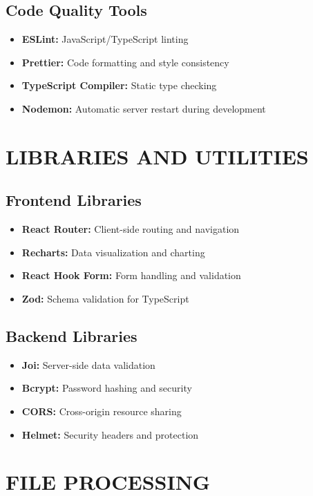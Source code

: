 \subsection{Code Quality Tools}

\begin{itemize}
\item \textbf{ESLint:} JavaScript/TypeScript linting
\item \textbf{Prettier:} Code formatting and style consistency
\item \textbf{TypeScript Compiler:} Static type checking
\item \textbf{Nodemon:} Automatic server restart during development
\end{itemize}

\section{LIBRARIES AND UTILITIES}

\subsection{Frontend Libraries}

\begin{itemize}
\item \textbf{React Router:} Client-side routing and navigation
\item \textbf{Recharts:} Data visualization and charting
\item \textbf{React Hook Form:} Form handling and validation
\item \textbf{Zod:} Schema validation for TypeScript
\end{itemize}

\subsection{Backend Libraries}

\begin{itemize}
\item \textbf{Joi:} Server-side data validation
\item \textbf{Bcrypt:} Password hashing and security
\item \textbf{CORS:} Cross-origin resource sharing
\item \textbf{Helmet:} Security headers and protection
\end{itemize}

\section{FILE PROCESSING}

